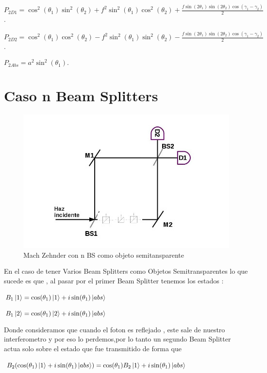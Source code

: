 \documentclass[11pt]{article}
\begin{document}
\vspace{5cm}
$P_
{2D1}=\cos^2(\theta_
{1})\sin^2(\theta_
{2})+f^2 \sin^2(\theta_
{1})\cos^2(\theta_
{2})+\frac{f \sin(2\theta_
{1})\sin(2\theta_
{2})\cos
(\gamma_{1}-\gamma_{2})}{2}$.

$P_
{2D2}=\cos^2(\theta_
{1})\cos^2(\theta_
{2})- f^2 \sin^2(\theta_
{1})\sin^2(\theta_
{2})-\frac{f \sin(2\theta_
{1})\sin(2\theta_
{2})\cos
(\gamma_{1}-\gamma_{2})}{2}$.

$P_
{2Abs}=a^2 \sin^2(\theta_
{1})$.


\section{Caso n Beam Splitters }
\vspace{1 cm}
\begin{figure}[h!]
\centering
\includegraphics[width=\linewidth]{machzenhderBSS.jpg}
\caption{Mach Zehnder con n BS como objeto semitansparente}
\label{fig:BS2}
\end{figure}

En el caso de tener Varios Beam Splitters como Objetos Semitransparentes lo que sucede es que , al pasar por el primer Beam Splitter tenemos los estados :


$B_{1}\ket{1}=\cos(\theta_{1})\ket{1}+i\sin(\theta_{1})\ket{abs}$

$B_{1}\ket{2}=\cos(\theta_{1})\ket{2}+i\sin(\theta_{1})\ket{abs}$

Donde consideramos que cuando el foton es reflejado , este sale de nuestro interferometro y por eso lo perdemos,por lo tanto un segundo Beam Splitter actua solo sobre el estado que fue transmitido de forma que 

$B_{2}(\cos(\theta_{1})\ket{1}+i\sin(\theta_{1})\ket{abs})=\cos(\theta_{1})B_{2}\ket{1}+i\sin(\theta_{1})\ket{abs}$
\end{document}
